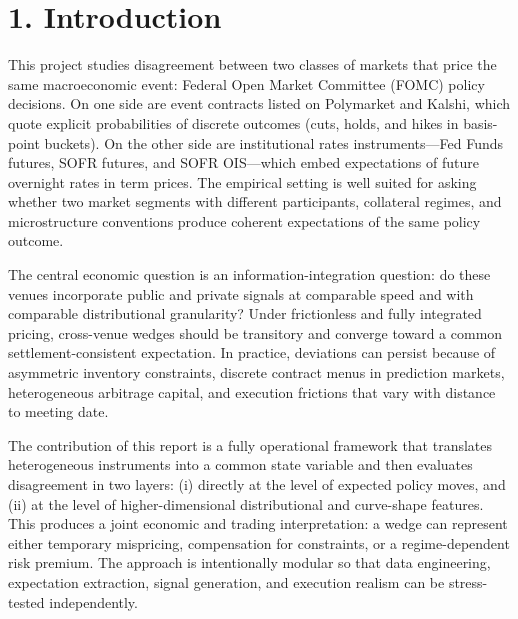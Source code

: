 
\section*{1. Introduction}

This project studies disagreement between two classes of markets that price the same macroeconomic event: Federal Open Market Committee (FOMC) policy decisions. On one side are event contracts listed on Polymarket and Kalshi, which quote explicit probabilities of discrete outcomes (cuts, holds, and hikes in basis-point buckets). On the other side are institutional rates instruments---Fed Funds futures, SOFR futures, and SOFR OIS---which embed expectations of future overnight rates in term prices. The empirical setting is well suited for asking whether two market segments with different participants, collateral regimes, and microstructure conventions produce coherent expectations of the same policy outcome.

The central economic question is an information-integration question: do these venues incorporate public and private signals at comparable speed and with comparable distributional granularity? Under frictionless and fully integrated pricing, cross-venue wedges should be transitory and converge toward a common settlement-consistent expectation. In practice, deviations can persist because of asymmetric inventory constraints, discrete contract menus in prediction markets, heterogeneous arbitrage capital, and execution frictions that vary with distance to meeting date.

The contribution of this report is a fully operational framework that translates heterogeneous instruments into a common state variable and then evaluates disagreement in two layers: (i) directly at the level of expected policy moves, and (ii) at the level of higher-dimensional distributional and curve-shape features. This produces a joint economic and trading interpretation: a wedge can represent either temporary mispricing, compensation for constraints, or a regime-dependent risk premium. The approach is intentionally modular so that data engineering, expectation extraction, signal generation, and execution realism can be stress-tested independently.

